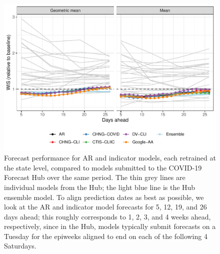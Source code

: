 \documentclass[9pt,twoside,lineno]{pnas-new}
\begin{document}
\clearpage

\begin{figure}

{\centering \includegraphics[width=\textwidth]{fig/compare-states-to-hub} 

}

\caption{Forecast performance for AR and indicator models, each retrained at the state level, compared to models submitted to the COVID-19 Forecast Hub over the same period. The thin grey lines are individual models from the Hub; the light blue line is the Hub ensemble model. To align prediction dates as best as possible, we look at the AR and indicator model forecasts for 5, 12, 19, and 26 days ahead; this roughly corresponds to 1, 2, 3, and 4 weeks ahead, respectively, since in the Hub, models typically submit forecasts on a Tuesday for the epiweeks aligned to end on each of the following 4 Saturdays.}\label{fig:compare-to-hub}
\end{figure}

\clearpage
\end{document}
